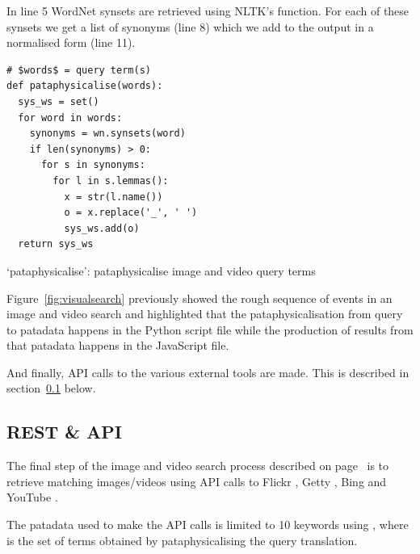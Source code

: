 In line 5 WordNet synsets are retrieved using \ac{NLTK}'s  function. For each of these synsets we get a list of synonyms (line 8) which we add to the output in a normalised form (line 11).

\begin{listing}
  \begin{verbatim}
# $words$ = query term(s)
def pataphysicalise(words):
  sys_ws = set()
  for word in words:
    synonyms = wn.synsets(word)
    if len(synonyms) > 0:
      for s in synonyms:
        for l in s.lemmas():
          x = str(l.name())
          o = x.replace('_', ' ')
          sys_ws.add(o)
  return sys_ws
  \end{verbatim}
\caption[`pataphysicalise' function]{`pataphysicalise': pataphysicalise image and video query terms}
\label{code:pataph}
\end{listing}

Figure~\ref{fig:visualsearch} previously showed the rough sequence of events in an image and video search and highlighted that the pataphysicalisation from query to patadata happens in the  Python script file while the production of results from that patadata happens in the  JavaScript file.

And finally, \ac{API} calls to the various external tools are made. This is described in section~\ref{s:api} below.


\subsection{REST \& API}
\label{s:api}

The final step of the image and video search process described on page~\pageref{s:imgvid} is to retrieve matching images/videos using \ac{API} calls to Flickr \autocite{FlickrAPI,FlickrGuideAPI}, Getty \autocite{GettyAPI,GettyOverviewAPI}, Bing \autocite{BingAPI,BingAzureAPI} and YouTube \autocite{YouTubeAPI}.

The patadata used to make the \ac{API} calls is limited to 10 keywords using , where  is the set of terms obtained by pataphysicalising the query translation.


